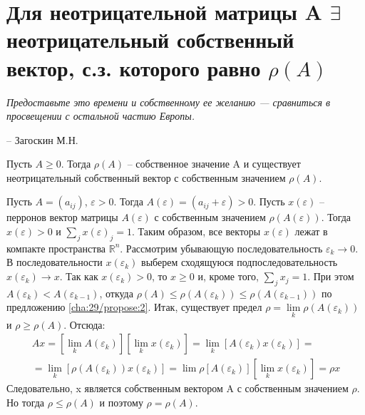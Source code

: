 \chapter{Для неотрицательной матрицы A $\exists$ неотрицательный собственный вектор, с.з. которого равно $\rho(A)$}
\label{cha:33}

\epigraph{
	\textit{Предоставьте это времени и собственному ее желанию — сравниться в просвещении с остальной частию Европы.}}
{-- Загоскин М.Н.}

\begin{theorem}[]\label{cha:33/the:1}
	Пусть $A \ge 0$. Тогда $\rho(A)$ – собственное значение A и существует неотрицательный собственный вектор с собственным значением $\rho(A)$.
\end{theorem}
\begin{Proof}
	Пусть $A = (a_{ij})$, $\varepsilon > 0$. Тогда $A(\varepsilon) = (a_{ij} + \varepsilon) > 0$. Пусть $x(\varepsilon)$ – перронов вектор матрицы $A(\varepsilon)$ с собственным значением $\rho(A(\varepsilon))$. Тогда $x(\varepsilon) > 0$ и $\underset{j}{\overset{}{\sum}} x(\varepsilon)_j = 1$. Таким образом, все векторы $x(\varepsilon)$ лежат в компакте пространства $\mathbb{R}^n$. Рассмотрим убывающую последовательность $\varepsilon_k \to 0$. В последовательности $x(\varepsilon_k)$ выберем сходящуюся подпоследовательность $x(\varepsilon_k) \to x$. Так как $x(\varepsilon_k) > 0$, то $x \ge 0$ и, кроме того, $\underset{j}{\overset{}{\sum}}x_j = 1$. При этом $A(\varepsilon_k) < A(\varepsilon_{k−1})$, откуда $\rho(A) \le \rho(A(\varepsilon_k)) \le \rho(A(\varepsilon_{k−1}))$ по предложению \ref{cha:29/propose:2}. Итак, существует предел $\rho = \underset{k}{\lim} \rho(A(\varepsilon_k))$ и $\rho \ge \rho(A)$. Отсюда:
	$$\begin{gathered}
		Ax = [\underset{k}{\lim} A(\varepsilon_k)][\underset{k}{\lim} x(\varepsilon_k)] = \underset{k}{\lim} [A(\varepsilon_k)x(\varepsilon_k)] = \\
		= \underset{k}{\lim} [\rho (A(\varepsilon_k )) x(\varepsilon_k )] = \lim \rho [A(\varepsilon_k )] [\underset{k}{\lim} x(\varepsilon_k )] = \rho x
	\end{gathered}$$
	Следовательно, x является собственным вектором A с собственным значением $\rho$. Но тогда $\rho \le \rho(A)$ и поэтому $\rho = \rho(A)$.
\end{Proof}


























